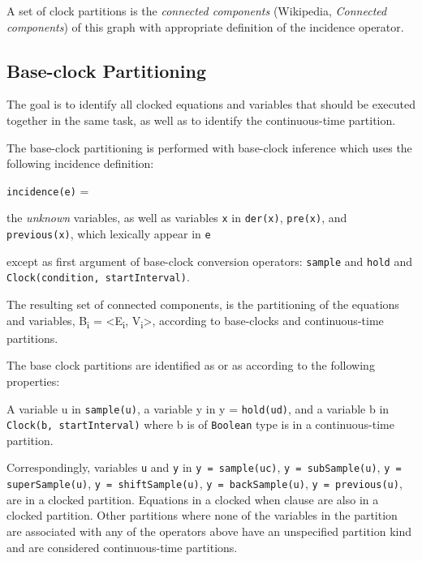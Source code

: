 A set of clock partitions is the \emph{connected components} (Wikipedia,
\emph{Connected components}) of this graph with appropriate definition of
the incidence operator.

\subsection{Base-clock Partitioning}\label{base-clock-partitioning}

The goal is to identify all clocked equations and variables that should
be executed together in the same task, as well as to identify the
continuous-time partition.

The base-clock partitioning is performed with base-clock inference which
uses the following incidence definition:

\lstinline!incidence(e)! =
\begin{list}{}{\setlength{\leftmargin}{2em}\setlength{\topsep}{-\parskip}}
\item
the \emph{unknown} variables, as well as variables \lstinline!x! in \lstinline!der(x)!, \lstinline!pre(x)!, and \lstinline!previous(x)!, which lexically appear in \lstinline!e!
\begin{list}{}{\setlength{\leftmargin}{2em}\setlength{\topsep}{-\parskip}}
\item
except as first argument of base-clock conversion operators: \lstinline!sample! and \lstinline!hold! and \lstinline!Clock(condition, startInterval)!.
\end{list}
\end{list}\vspace{\parskip}%

The resulting set of connected components, is the partitioning of the
equations and variables, B\textsubscript{i} =
\textless{}E\textsubscript{i}, V\textsubscript{i}\textgreater{},
according to base-clocks and continuous-time partitions.

The base clock partitions are identified as  or as  according to the following properties:

A variable u in \lstinline!sample(u)!, a variable y in y =
\lstinline!hold(ud)!, and a variable b in \lstinline!Clock(b, startInterval)! where b is of \lstinline!Boolean! type is in a continuous-time partition.

Correspondingly, variables \lstinline!u! and \lstinline!y! in
\lstinline!y = sample(uc)!,
\lstinline!y = subSample(u)!,
\lstinline!y = superSample(u)!,
\lstinline!y = shiftSample(u)!,
\lstinline!y = backSample(u)!,
\lstinline!y = previous(u)!, are in a clocked partition. Equations in a clocked
when clause are also in a clocked partition.
Other partitions where none of the variables in the partition are
associated with any of the operators above have an unspecified partition
kind and are considered continuous-time partitions.

